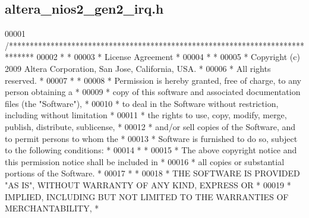 \subsection{altera\+\_\+nios2\+\_\+gen2\+\_\+irq.\+h}
\label{altera__nios2__gen2__irq_8h_source}

\begin{DoxyCode}
00001 \textcolor{comment}{/******************************************************************************}
00002 \textcolor{comment}{*                                                                             *}
00003 \textcolor{comment}{* License Agreement                                                           *}
00004 \textcolor{comment}{*                                                                             *}
00005 \textcolor{comment}{* Copyright (c) 2009 Altera Corporation, San Jose, California, USA.           *}
00006 \textcolor{comment}{* All rights reserved.                                                        *}
00007 \textcolor{comment}{*                                                                             *}
00008 \textcolor{comment}{* Permission is hereby granted, free of charge, to any person obtaining a     *}
00009 \textcolor{comment}{* copy of this software and associated documentation files (the "Software"),  *}
00010 \textcolor{comment}{* to deal in the Software without restriction, including without limitation   *}
00011 \textcolor{comment}{* the rights to use, copy, modify, merge, publish, distribute, sublicense,    *}
00012 \textcolor{comment}{* and/or sell copies of the Software, and to permit persons to whom the       *}
00013 \textcolor{comment}{* Software is furnished to do so, subject to the following conditions:        *}
00014 \textcolor{comment}{*                                                                             *}
00015 \textcolor{comment}{* The above copyright notice and this permission notice shall be included in  *}
00016 \textcolor{comment}{* all copies or substantial portions of the Software.                         *}
00017 \textcolor{comment}{*                                                                             *}
00018 \textcolor{comment}{* THE SOFTWARE IS PROVIDED "AS IS", WITHOUT WARRANTY OF ANY KIND, EXPRESS OR  *}
00019 \textcolor{comment}{* IMPLIED, INCLUDING BUT NOT LIMITED TO THE WARRANTIES OF MERCHANTABILITY,    *}

\end{DoxyCode}
